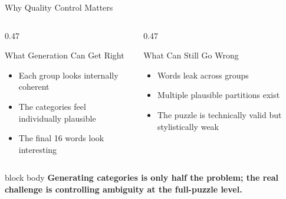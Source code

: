\documentclass[11pt,aspectratio=169]{beamer}
\newcommand{\KeyMessage}[1]{%
  \begin{beamercolorbox}[wd=\linewidth,rounded=true,sep=8pt]{block body}
    \centering\bfseries #1
  \end{beamercolorbox}
}
\begin{document}
\begin{frame}{Why Quality Control Matters}
  \begin{columns}[T,onlytextwidth]
    \begin{column}{0.47\textwidth}
      \begin{exampleblock}{What Generation Can Get Right}
        \begin{itemize}
          \item Each group looks internally coherent
          \item The categories feel individually plausible
          \item The final 16 words look interesting
        \end{itemize}
      \end{exampleblock}
    \end{column}
    \begin{column}{0.47\textwidth}
      \begin{alertblock}{What Can Still Go Wrong}
        \begin{itemize}
          \item Words leak across groups
          \item Multiple plausible partitions exist
          \item The puzzle is technically valid but stylistically weak
        \end{itemize}
      \end{alertblock}
    \end{column}
  \end{columns}

  \vspace{0.25cm}
  \KeyMessage{Generating categories is only half the problem; the real challenge is controlling ambiguity at the full-puzzle level.}
\end{frame}
\end{document}

